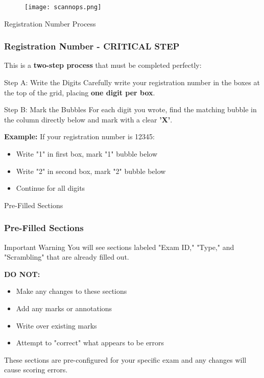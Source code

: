 \documentclass{beamer}
\begin{document}
\begin{frame}

\begin{figure}
    \centering
    \texttt{[image: scannops.png]}
\end{figure}
\end{frame}

\begin{frame}{Registration Number Process}
\frametitle{Registration Number - CRITICAL STEP}
This is a \textbf{two-step process} that must be completed perfectly:

\begin{block}{Step A: Write the Digits}
Carefully write your registration number in the boxes at the top of the grid, placing \textbf{one digit per box}.
\end{block}

\begin{block}{Step B: Mark the Bubbles}
For each digit you wrote, find the matching bubble in the column directly below and mark with a clear \textbf{'X'}.
\end{block}

\textbf{Example:} If your registration number is 12345:
\begin{itemize}
\item Write "1" in first box, mark "1" bubble below
\item Write "2" in second box, mark "2" bubble below
\item Continue for all digits
\end{itemize}
\end{frame}

\begin{frame}{Pre-Filled Sections}
\frametitle{Pre-Filled Sections}
\begin{block}{Important Warning}
You will see sections labeled "Exam ID," "Type," and "Scrambling" that are already filled out.
\end{block}

\textbf{DO NOT:}
\begin{itemize}
\item Make any changes to these sections
\item Add any marks or annotations
\item Write over existing marks
\item Attempt to "correct" what appears to be errors
\end{itemize}

These sections are pre-configured for your specific exam and any changes will cause scoring errors.

\end{frame}
\end{document}
